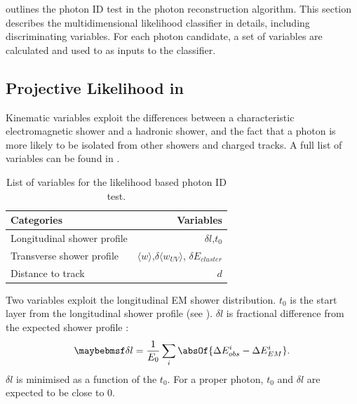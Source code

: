  outlines the photon ID test in the photon reconstruction algorithm. This section describes the multidimensional likelihood classifier in details, including discriminating variables. For each photon candidate, a set of variables are calculated and used to as inputs to the classifier.




\subsection{Projective Likelihood in \pandora}

Kinematic variables exploit the differences between a characteristic electromagnetic shower and a hadronic shower, and the fact that a photon is more likely to be isolated from other showers and charged tracks. A full list of variables can be found in .

\begin{table}[htbp] \centering \smallskip
\begin{tabular}{l r }
\hline
\hline
Categories&  Variables\\
\hline
Longitudinal shower profile & $\delta{l}$,$t_0$ \\
Transverse shower profile & $\langle{w}\rangle$,$\delta{\langle{w_{UV}}\rangle}$, $\delta E_{cluster}$ \\
Distance to track &  $d$ \\
\hline
\hline
\end{tabular}
\caption
{List of variables for the likelihood based photon ID test.}
\label{tab:photonPhotonIDvar}
\end{table}

Two variables exploit the longitudinal EM shower distribution. $t_0$ is the start layer from the longitudinal shower profile (see ). $\delta{l}$ is fractional difference from the expected shower profile \cite{Thomson:2009rp}:
\begin{equation}
\delta l = \frac{1}{E_0}\sum_{i}^{}\absOf{\Delta E_{obs}^i - \Delta E_{EM}^i }.
\end{equation}
$\delta l$ is minimised as a function of the $t_0$. For a proper photon, $t_0$  and $\delta l $ are expected to be close to 0.

